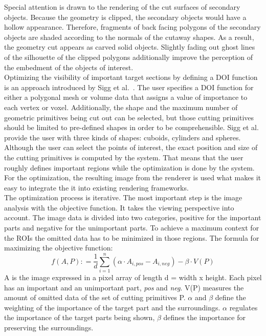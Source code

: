 Special attention is drawn to the rendering of the cut surfaces of secondary objects. Because the geometry is clipped, the secondary objects would have a hollow appearance. Therefore, fragments of back facing polygons of the secondary objects are shaded according to the normals of the cutaway shapes. As a result, the geometry cut appears as carved solid objects. Slightly fading out ghost lines of the silhouette of the clipped polygons additionally improve the perception of the embedment of the objects of interest.\\
\newline
Optimizing the visibility of important target sections by defining a DOI function is an approach introduced by Sigg et al.~\cite{proc:intelligentCutaway}. The user specifies a DOI function for either a polygonal mesh or volume data that assigns a value of importance to each vertex or voxel. Additionally, the shape and the maximum number of geometric primitives being cut out can be selected, but those cutting primitives should be limited to pre-defined shapes in order to be comprehensible. Sigg et al. provide the user with three kinds of shapes: cuboids, cylinders and spheres. Although the user can select the points of interest, the exact position and size of the cutting primitives is computed by the system. That means that the user roughly defines important regions while the optimization is done by the system. For the optimization, the resulting image from the renderer is used what makes it easy to integrate the it into existing rendering frameworks.\\
The optimization process is iterative. The most important step is the image analysis with the objective function. It takes the viewing perspective into account. The image data is divided into two categories, positive for the important parts and negative for the unimportant parts. To achieve a maximum context for the ROIs the omitted data has to be minimized in those regions. The formula for maximizing the objective function:\\
\begin{equation}
f(A, P) \colon= \frac{1}{d} \sum^n_{i=1} (\alpha\cdot A_{i,pos} - A_{i,neg}) - \beta\cdot V(P)
\label{eq:objectiveFunction}
\end{equation}
A is the image expressed in a pixel array of length d = width x height. Each pixel has an important and an unimportant part, \emph{pos} and \emph{neg}. V(P) measures the amount of omitted data of the set of cutting primitives P. $\alpha$ and $\beta$ define the weighting of the importance of the target part and the surroundings. $\alpha$ regulates the importance of the target parts being shown, $\beta$ defines the importance for preserving the surroundings.\\
